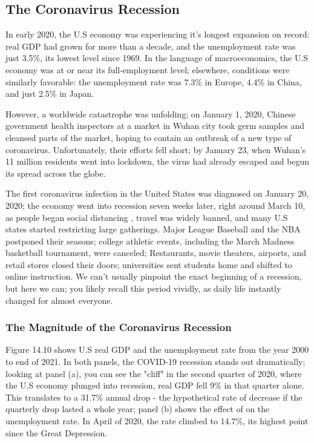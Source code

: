 \documentclass[11pt]{article} %
\begin{document}
\subsection*{The Coronavirus Recession}
In early 2020, the U.S economy was experiencing it's longest expansion on record: real GDP had grown for more than a decade, and the unemployment rate was just 3.5\%, its lowest level since 1969. In the language of macroeconomics, the U.S economy was at or near its full-employment level; elsewhere, conditions were similarly favorable: the unemployment rate was 7.3\% in Europe, 4.4\% in China, and just 2.5\% in Japan.

However, a worldwide catastrophe was unfolding; on January 1, 2020, Chinese government health inspectors at a market in Wuhan city took germ samples and cleansed parts of the market, hoping to contain an outbreak of a new type of coronavirus. Unfortunately, their efforts fell short; by January 23, when Wuhan's 11 million residents went into lockdown, the virus had already escaped and begun its spread across the globe.

The first coronavirus infection in the United States was diagnosed on January 20, 2020; the economy went into recession seven weeks later, right around March 10, as people began social distancing , travel was widely banned, and many U.S states started restricting large gatherings. Major League Baseball and the NBA postponed their seasons; college athletic events, including the March Madness basketball tournament, were canceled; Restaurants, movie theaters, airports, and retail stores closed their doors; universities sent students home and shifted to online instruction. We can't usually pinpoint the exact beginning of a recession, but here we can; you likely recall this period vividly, as daily life instantly changed for almost everyone.

\subsubsection*{The Magnitude of the Coronavirus Recession}
Figure 14.10 shows U.S real GDP and the unemployment rate from the year 2000 to end of 2021. In both panels, the COVID-19 recession stands out dramatically; looking at panel (a), you can see the "cliff" in the second quarter of 2020, where the U.S economy plunged into recession, real GDP fell 9\% in that quarter alone. This translates to a 31.7\% annual drop - the hypothetical rate of decrease if the quarterly drop lasted a whole year; panel (b) shows the effect of on the unemployment rate. In April of 2020, the rate climbed to 14.7\%, its highest point since the Great Depression.
\end{document}
